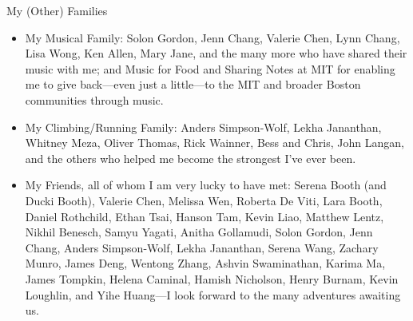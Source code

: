 \begin{center}{My (Other) Families}\end{center} 
    \begin{itemize}
    \item My Musical Family: Solon Gordon, Jenn Chang, Valerie Chen, Lynn Chang,
        Lisa Wong, Ken Allen, Mary Jane, and the many more who have shared their
            music with me; and Music for Food and Sharing Notes at MIT for
            enabling me to give back---even just a little---to the MIT and
            broader Boston communities through music.    

    \item My Climbing/Running Family: Anders Simpson-Wolf, Lekha Jananthan, Whitney
        Meza, Oliver Thomas, Rick Wainner, Bess and Chris, John Langan, and the
            others who helped me become the strongest I've ever been.

    \item My Friends, all of whom I am very lucky to have met: Serena Booth (and
        Ducki Booth), Valerie Chen, Melissa Wen, Roberta De Viti, Lara Booth,
            Daniel Rothchild, Ethan Tsai, Hanson Tam, Kevin Liao, Matthew Lentz,
            Nikhil Benesch, Samyu Yagati, Anitha Gollamudi, Solon Gordon, Jenn
            Chang, Anders Simpson-Wolf, Lekha Jananthan, Serena Wang, Zachary Munro,
            James Deng, Wentong Zhang, Ashvin Swaminathan, Karima Ma, James
            Tompkin, Helena Caminal, Hamish Nicholson, Henry Burnam, Kevin
            Loughlin, and Yihe Huang---I look forward to the many adventures
            awaiting us.
    \end{itemize}
 
